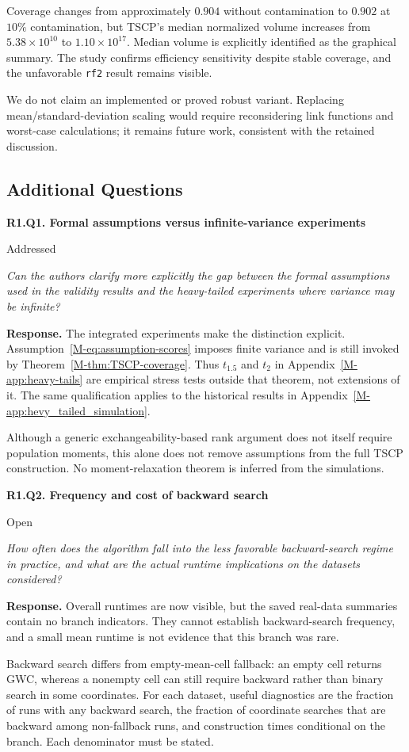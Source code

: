 \documentclass[11pt]{article}
\newcommand{\msapp}[1]{Appendix~\ref*{M-#1}}
\newcommand{\point}[3]{\par\Needspace{7\baselineskip}\medskip
\noindent\parbox[t]{0.77\linewidth}{\textbf{#1}}\hfill
\parbox[t]{0.21\linewidth}{\raggedleft\small\sffamily #2}\par\nopagebreak
{\color{ReviewerBlue}\small\itshape #3\par}\textbf{Response.} }
\begin{document}
Coverage changes from approximately $0.904$ without contamination to $0.902$ at $10\%$ contamination, but TSCP's median normalized volume increases from $5.38\times10^{10}$ to $1.10\times10^{17}$. Median volume is explicitly identified as the graphical summary. The study confirms efficiency sensitivity despite stable coverage, and the unfavorable \texttt{rf2} result remains visible.

We do not claim an implemented or proved robust variant. Replacing mean/standard-deviation scaling would require reconsidering link functions and worst-case calculations; it remains future work, consistent with the retained discussion.

\subsection*{Additional Questions}

\point{R1.Q1. Formal assumptions versus infinite-variance experiments}{Addressed}{Can the authors clarify more explicitly the gap between the formal
assumptions used in the validity results and the heavy-tailed
experiments where variance may be infinite?}
\label{response:R1.Q1}
The integrated experiments make the distinction explicit. Assumption~\ref*{M-eq:assumption-scores} imposes finite variance and is still invoked by Theorem~\ref*{M-thm:TSCP-coverage}. Thus $t_{1.5}$ and $t_2$ in \msapp{app:heavy-tails} are empirical stress tests outside that theorem, not extensions of it. The same qualification applies to the historical results in \msapp{app:hevy_tailed_simulation}.

Although a generic exchangeability-based rank argument does not itself require population moments, this alone does not remove assumptions from the full TSCP construction. No moment-relaxation theorem is inferred from the simulations.

\point{R1.Q2. Frequency and cost of backward search}{Open}{How often does the algorithm fall into the less favorable
backward-search regime in practice, and what are the actual runtime
implications on the datasets considered?}
\label{response:R1.Q2}
Overall runtimes are now visible, but the saved real-data summaries contain no branch indicators. They cannot establish backward-search frequency, and a small mean runtime is not evidence that this branch was rare.

Backward search differs from empty-mean-cell fallback: an empty cell returns GWC, whereas a nonempty cell can still require backward rather than binary search in some coordinates. For each dataset, useful diagnostics are the fraction of runs with any backward search, the fraction of coordinate searches that are backward among non-fallback runs, and construction times conditional on the branch. Each denominator must be stated.
\end{document}

